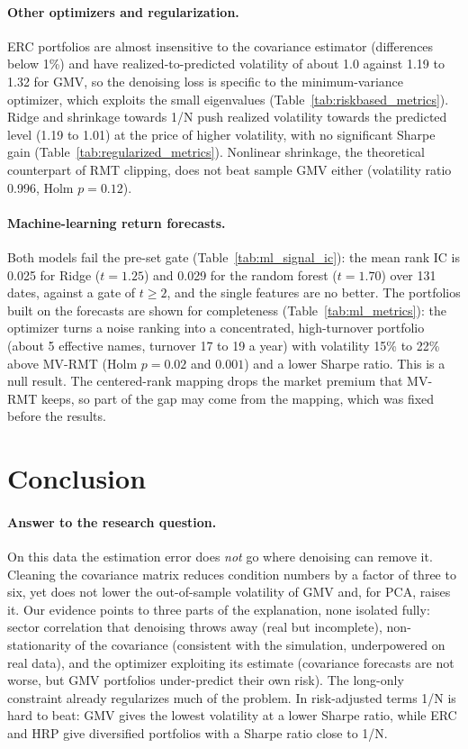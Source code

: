 \documentclass[11pt,a4paper]{article}
\begin{document}
\paragraph{Other optimizers and regularization.} ERC portfolios are almost insensitive to the covariance estimator
(differences below 1\%) and have realized-to-predicted volatility of about 1.0 against 1.19 to 1.32 for GMV, so the
denoising loss is specific to the minimum-variance optimizer, which exploits the small eigenvalues
(Table~\ref{tab:riskbased_metrics}). Ridge and shrinkage towards 1/N push realized volatility towards the
predicted level (1.19 to 1.01) at the price of higher volatility, with no significant Sharpe gain
(Table~\ref{tab:regularized_metrics}). Nonlinear shrinkage, the theoretical counterpart of RMT clipping, does not
beat sample GMV either (volatility ratio 0.996, Holm $p=0.12$).

\paragraph{Machine-learning return forecasts.} Both models fail the pre-set gate (Table~\ref{tab:ml_signal_ic}): the
mean rank IC is 0.025 for Ridge ($t=1.25$) and 0.029 for the random forest ($t=1.70$) over 131 dates, against a gate
of $t\ge2$, and the single features are no better. The portfolios built on the forecasts are shown for completeness
(Table~\ref{tab:ml_metrics}): the optimizer turns a noise ranking into a concentrated, high-turnover portfolio
(about 5 effective names, turnover 17 to 19 a year) with volatility 15\% to 22\% above MV-RMT (Holm $p=0.02$ and
$0.001$) and a lower Sharpe ratio. This is a null result. The centered-rank mapping drops the market premium that
MV-RMT keeps, so part of the gap may come from the mapping, which was fixed before the results.

\section{Conclusion}

\paragraph{Answer to the research question.} On this data the estimation error does \emph{not} go where denoising
can remove it. Cleaning the covariance matrix reduces condition numbers by a factor of three to six, yet does not
lower the out-of-sample volatility of GMV and, for PCA, raises it. Our evidence points to three parts of the
explanation, none isolated fully: sector correlation that denoising throws away (real but incomplete),
non-stationarity of the covariance (consistent with the simulation, underpowered on real data), and the optimizer
exploiting its estimate (covariance forecasts are not worse, but GMV portfolios under-predict their own risk). The
long-only constraint already regularizes much of the problem. In risk-adjusted terms 1/N is hard to beat: GMV gives
the lowest volatility at a lower Sharpe ratio, while ERC and HRP give diversified portfolios with a Sharpe ratio
close to 1/N.
\end{document}
